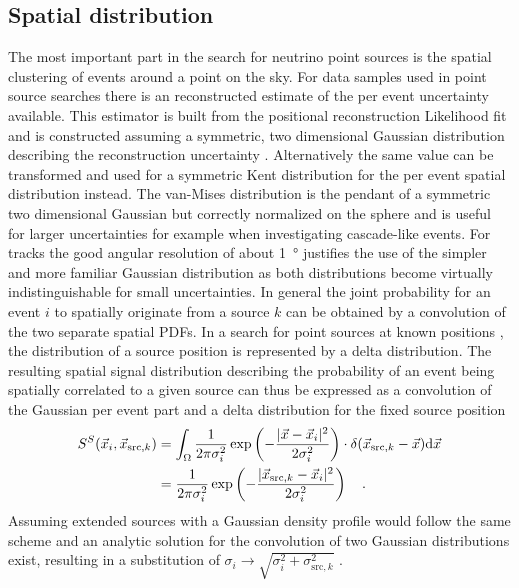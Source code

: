 \subsection{Spatial distribution}
The most important part in the search for neutrino point sources is the spatial clustering of events around a point on the sky.
For data samples used in point source searches there is an reconstructed estimate of the per event uncertainty available.
This estimator is built from the positional reconstruction Likelihood fit and is constructed assuming a symmetric, two dimensional Gaussian distribution describing the reconstruction uncertainty .
Alternatively the same value can be transformed and used for a symmetric Kent distribution  for the per event spatial distribution instead.
The van-Mises distribution is the pendant of a symmetric two dimensional Gaussian but correctly normalized on the sphere and is useful for larger uncertainties for example when investigating cascade-like events.
For tracks the good angular resolution of about \SI{1}{\degree} justifies the use of the simpler and more familiar Gaussian distribution as both distributions become virtually indistinguishable for small uncertainties.
In general the joint probability for an event $i$ to spatially originate from a source $k$ can be obtained by a convolution of the two separate spatial PDFs.
In a search for point sources at known positions , the distribution of a source position is represented by a delta distribution.
The resulting spatial signal distribution describing the probability of an event being spatially correlated to a given source can thus be expressed as a convolution of the Gaussian per event part and a delta distribution for the fixed source position
\begin{equation}
  \begin{aligned}
    S^S(\vec{x}_i, \vec{x}_{\mathrm{src},k}) &=
      \int_\Omega \frac{1}{2\pi \sigma_i^2}
      \exp\left(-\frac{|\vec{x}-\vec{x}_i|^2}{2\sigma_i^2}\right) \cdot
      \delta(\vec{x}_{\mathrm{src},k} - \vec{x}) \mathrm{d}\vec{x} \\
      &= \frac{1}{2\pi \sigma_i^2}
         \exp\left(-\frac{|\vec{x}_{\mathrm{src},k}-
                          \vec{x}_i|^2}{2\sigma_i^2}\right)
      \quad\text{.}
  \end{aligned}
\end{equation}
Assuming extended sources with a Gaussian density profile would follow the same scheme and an analytic solution for the convolution of two Gaussian distributions exist, resulting in a substitution of $\sigma_i \rightarrow \sqrt{\sigma_i^2 + \sigma_{\text{src},k}^2}$ .

